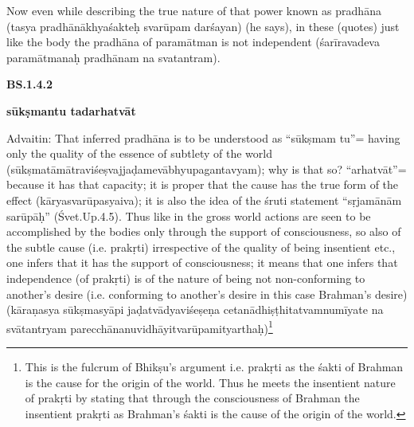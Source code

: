\newpage

Now even while describing the true nature of that power known as pradhāna (tasya pradhānākhyaśakteḥ svarūpam darśayan) (he says), in these (quotes)  just like the body the pradhāna of paramātman is not independent (śarīravadeva paramātmanaḥ pradhānam na svatantram). 

\textbf{}




\textbf{BS.1.4.2}

\textbf{sūkṣmantu tadarhatvāt}

Advaitin: That inferred pradhāna is to be understood as “sūkṣmam tu”=   having only the quality of the essence of subtlety of the world (sūkṣmatāmātraviśeṣvajjaḍamevābhyupagantavyam); why is that so? “arhatvāt”= because it has that capacity; it is proper that the cause has the true form of the effect (kāryasvarūpasyaiva); it is also the idea of the śruti statement “sṛjamānām sarūpāḥ” (Śvet.Up.4.5). Thus like in the gross world actions are seen to be accomplished by the bodies only through the support of consciousness, so also of the subtle cause (i.e. prakṛti) irrespective of the quality of being insentient etc., one infers that it has the support of consciousness; it means that one infers that independence (of prakṛti)  is of the nature of being not non-conforming to another’s desire (i.e. conforming to another’s desire in this case Brahman’s desire) (kāraṇasya sūkṣmasyāpi jaḍatvādyaviśeṣeṇa cetanādhiṣṭhitatvamnumīyate na svātantryam parecchānanuvidhāyitvarūpamityarthaḥ)\footnote{This is the fulcrum of Bhikṣu’s argument i.e. prakṛti as the śakti of Brahman is the cause for the origin of the world. Thus he meets the insentient nature of prakṛti by stating that through the consciousness of Brahman the insentient prakṛti as Brahman’s śakti is the cause of the origin of the world.}

